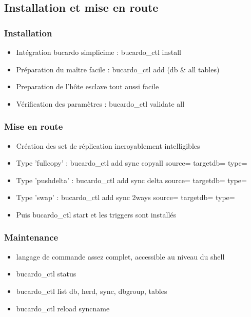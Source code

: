 \documentclass[utf8]{beamer}
\begin{document}
\subsection{Installation et mise en route}

\begin{frame}
  \frametitle{Installation} 

  \begin{itemize}
  \item Intégration bucardo simplicime : bucardo\_ctl install
  \item Préparation du maître facile : bucardo\_ctl add (db \& all tables)
  \item Preparation de l'hôte esclave tout aussi facile
  \item Vérification des paramètres : bucardo\_ctl validate all
  \end{itemize}
\end{frame}



\begin{frame}
  \frametitle{Mise en route} 

  \begin{itemize}
  \item Création des set de réplication incroyablement intelligibles
  \item Type 'fullcopy' : bucardo\_ctl add sync copyall source= targetdb= type=
  \item Type 'pushdelta' : bucardo\_ctl add sync delta source= targetdb= type=
  \item Type 'swap' : bucardo\_ctl add sync 2ways source= targetdb= type=
  \item Puis bucardo\_ctl start et les triggers sont installés
  \end{itemize}
\end{frame}


\begin{frame}
  \frametitle{Maintenance} 

  \begin{itemize}
  \item langage de commande assez complet, accessible au niveau du shell
  \item bucardo\_ctl status
  \item bucardo\_ctl list db, herd, sync, dbgroup, tables
  \item bucardo\_ctl reload syncname
  \end{itemize}
\end{frame}
\end{document}
